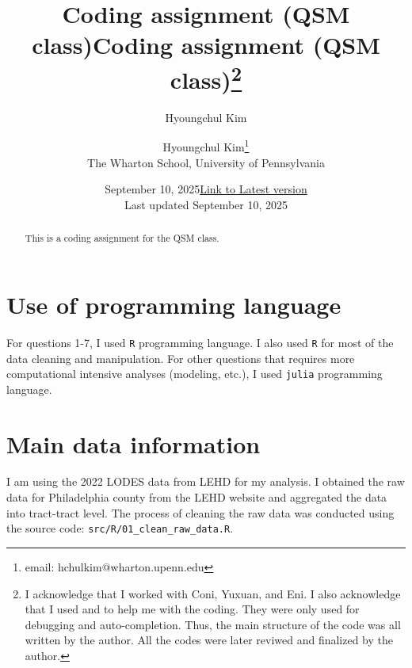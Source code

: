 \documentclass[
  11pt]{article}
\title{Coding assignment (QSM class)}
\author{Hyoungchul Kim}
\date{September 10, 2025}
\begin{document}
\def\spacingset#1{\renewcommand{\baselinestretch}%
{#1}\small\normalsize} \spacingset{1}



\date{\href{https://github.com/hchulkim/qsm-class/blob/main/output/output.pdf}{Link to Latest version}\\ \vspace{1em}  Last updated September
10, 2025}
\title{Coding assignment (QSM class)\thanks{I acknowledge that I worked
with Coni, Yuxuan, and Eni. I also acknowledge that I used
\citet{chatgpt} and \citet{cursor} to help me with the coding. They were
only used for debugging and auto-completion. Thus, the main structure of
the code was all written by the author. All the codes were later reviwed
and finalized by the author.}}
\author{
Hyoungchul Kim\thanks{email: hchulkim@wharton.upenn.edu}\\
The Wharton School, University of Pennsylvania\\
}
\maketitle

\bigskip
\bigskip
\begin{abstract}
This is a coding assignment for the QSM class.
\end{abstract}

\bigskip

\newpage
\spacingset{1.2} %

\section{Use of programming
language}\label{sec-use-of-programming-language}

For questions 1-7, I used \texttt{R} programming language. I also used
\texttt{R} for most of the data cleaning and manipulation. For other
questions that requires more computational intensive analyses (modeling,
etc.), I used \texttt{julia} programming language.

\section{Main data information}\label{sec-main-data-info}

I am using the 2022 LODES data from LEHD for my analysis. I obtained the
raw data for Philadelphia county from the LEHD website and aggregated
the data into tract-tract level. The process of cleaning the raw data
was conducted using the source code:
\texttt{src/R/01\_clean\_raw\_data.R}.
\end{document}
